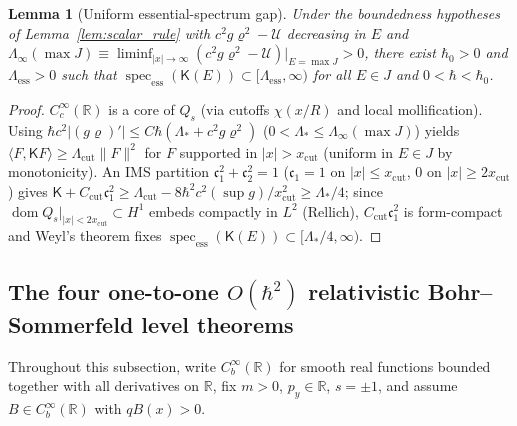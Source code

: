 \documentclass[aps,prd,onecolumn,tightenlines,nofootinbib,notitlepage,10pt,floatfix]{revtex4-2}
\theoremstyle{indentedtheorem}
\newtheorem{lemma}{Lemma}
\begin{document}
\begin{lemma}[Uniform essential-spectrum gap]\label{lem:ess}
Under the boundedness hypotheses of Lemma~\ref{lem:scalar_rule} with $c^2 g\varrho^2-\mathcal{U}$ decreasing in $E$ and $\Lambda_\infty(\max J)\equiv\liminf_{|x|\to\infty}(c^2 g\varrho^2-\mathcal{U})|_{E=\max J}>0$, there exist $\hbar_0>0$ and $\Lambda_\text{ess}>0$ such that $\operatorname{spec}_\text{ess}(\mathsf{K}(E))\subset[\Lambda_\text{ess},\infty)$ for all $E\in J$ and $0<\hbar<\hbar_0$.
\end{lemma}
\begin{proof}
$C_c^\infty(\mathbb{R})$ is a core of $Q_s$ (via cutoffs $\chi(x/R)$ and local mollification). Using $\hbar c^2|(g\varrho)'|\le C\hbar(\Lambda_*+c^2 g\varrho^2)$ ($0<\Lambda_*\le\Lambda_\infty(\max J)$) yields $\langle F,\mathsf{K}F\rangle\ge\Lambda_\text{cut}\|F\|^2$ for $F$ supported in $|x|>x_\text{cut}$ (uniform in $E\in J$ by monotonicity). An IMS partition $\mathfrak{c}_1^2+\mathfrak{c}_2^2=1$ ($\mathfrak{c}_1=1$ on $|x|\le x_\text{cut}$, $0$ on $|x|\ge 2x_\text{cut}$) gives $\mathsf{K}+C_\text{cut}\mathfrak{c}_1^2\ge\Lambda_\text{cut}-8\hbar^2 c^2(\sup g)/x_\text{cut}^2\ge\Lambda_*/4$; since $\operatorname{dom}Q_s|_{|x|<2x_\text{cut}}\subset H^1$ embeds compactly in $L^2$ (Rellich), $C_\text{cut}\mathfrak{c}_1^2$ is form-compact and Weyl's theorem fixes $\operatorname{spec}_\text{ess}(\mathsf{K}(E))\subset[\Lambda_*/4,\infty)$.
\end{proof}

\subsection{The four one-to-one \texorpdfstring{$O(\hbar^2)$}{O(hbar2)} relativistic Bohr--Sommerfeld level theorems}
\label{sec:four_theorems}

Throughout this subsection, write $C_b^\infty(\mathbb{R})$ for smooth real functions bounded together with all derivatives on $\mathbb{R}$, fix $m>0$, $p_y\in\mathbb{R}$, $s=\pm 1$, and assume $B\in C_b^\infty(\mathbb{R})$ with $qB(x)>0$.
\end{document}
